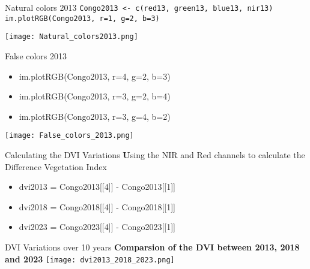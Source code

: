 \documentclass{beamer}
\begin{document}
\begin{frame}{Natural colors 2013}
 \texttt{Congo2013 <- c(red13, green13, blue13, nir13)
im.plotRGB(Congo2013, r=1, g=2, b=3) \\}
  \begin{center}
    \texttt{[image: Natural\_colors2013.png]}     
  \end{center}
\end{frame}

\begin{frame}[fragile]{False colors 2013}
  \begin{itemize}
      \item  im.plotRGB(Congo2013, r=4, g=2, b=3) 
 \item im.plotRGB(Congo2013, r=3, g=2, b=4) 
 \item im.plotRGB(Congo2013, r=3, g=4, b=2)
  \end{itemize}
  \vspace{0.3cm}
   \begin{center}
    \vspace{0.5cm}
    \texttt{[image: False\_colors\_2013.png]} 
  \end{center}
\end{frame}

\begin{frame}[fragile]{Calculating the DVI Variations}
  \vspace{0.5cm}
    \textbf Using the NIR and Red channels to calculate the Difference Vegetation Index 
        
    \begin{itemize}
    \vspace{0.5cm}
   \item  dvi2013 = Congo2013[[4]] - Congo2013[[1]]
   \item  dvi2018 = Congo2018[[4]] - Congo2018[[1]]
   \item  dvi2023 = Congo2023[[4]] - Congo2023[[1]]     
    \end{itemize}
     \vspace{0.5cm}  
\end{frame}

\begin{frame}[fragile]{DVI Variations over 10 years}
  \vspace{0.5cm}
  \textbf{Comparsion of the DVI between 2013, 2018 and 2023}
  \vspace{3.5cm}
  \centering
    \texttt{[image: dvi2013\_2018\_2023.png]}
 \end{frame}
\end{document}
